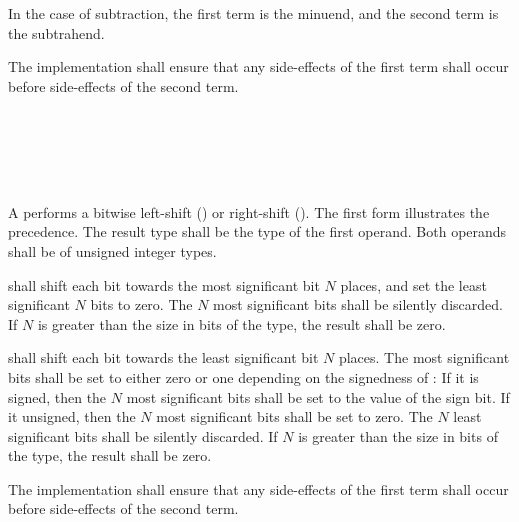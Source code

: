 \specsubsubitem
In the case of subtraction, the first term is the minuend, and the second term
is the subtrahend.

\specsubsubitem
The implementation shall ensure that any side-effects of the first term shall
occur before side-effects of the second term.


\begin{grammar}
 \\
	 \\
	 \terminal{\textless{}\textless{}}  \\
	 \terminal{\textgreater{}\textgreater{}}  \\
\end{grammar}

\specsubsubitem
A  performs a bitwise left-shift
(\terminal{\textless{}\textless{}}) or right-shift (\terminal{\textgreater{}\textgreater{}}). The first
form illustrates the precedence. The result type shall be the type of the first
operand. Both operands shall be of unsigned integer types.

\specsubsubitem
{} shall shift
each bit towards the most significant bit $N$ places, and set the least
significant $N$ bits to zero. The $N$ most significant bits shall be silently
discarded. If $N$ is greater than the size in bits of the type, the result shall
be zero.

\specsubsubitem
{} shall shift each bit towards the least significant bit $N$ places. The most
significant bits shall be set to either zero or one depending on the signedness
of : If it is signed, then the $N$ most
significant bits shall be set to the value of the sign bit. If it unsigned, then
the $N$ most significant bits shall be set to zero. The $N$ least significant
bits shall be silently discarded. If $N$ is greater than the size in bits of the
type, the result shall be zero.

\specsubsubitem
The implementation shall ensure that any side-effects of the first term shall
occur before side-effects of the second term.


